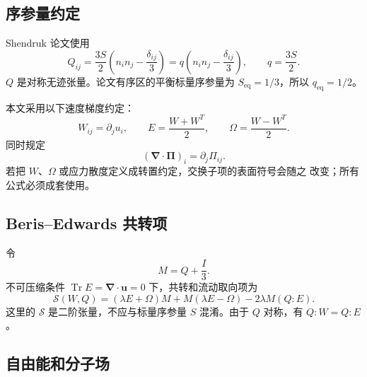 \documentclass[UTF8,11pt,a4paper]{ctexart}
\newcommand{\Tr}{\operatorname{Tr}}
\begin{document}
\subsection{序参量约定}

Shendruk 论文使用
\begin{equation}
  Q_{ij}=\frac{3S}{2}\left(n_i n_j-\frac{\delta_{ij}}{3}\right)
  =q\left(n_i n_j-\frac{\delta_{ij}}{3}\right),
  \qquad q=\frac{3S}{2}.
\end{equation}
$Q$ 是对称无迹张量。论文有序区的平衡标量序参量为
$S_{\mathrm{eq}}=1/3$，所以 $q_{\mathrm{eq}}=1/2$。

本文采用以下速度梯度约定：
\begin{equation}
  W_{ij}=\partial_j u_i,
  \qquad
  E=\frac{W+W^T}{2},
  \qquad
  \Omega=\frac{W-W^T}{2}.
\end{equation}
同时规定
\begin{equation}
  (\bm\nabla\!\cdot\bm\Pi)_i=\partial_j\Pi_{ij}.
  \label{eq:stress-divergence-convention}
\end{equation}
若把 $W$、$\Omega$ 或应力散度定义成转置约定，交换子项的表面符号会随之
改变；所有公式必须成套使用。

\subsection{Beris--Edwards 共转项}

令
\begin{equation}
  M=Q+\frac{I}{3}.
\end{equation}
不可压缩条件 $\Tr E=\bm\nabla\!\cdot\bm u=0$ 下，共转和流动取向项为
\begin{equation}
\boxed{
  \mathcal S(W,Q)
  =(\lambda E+\Omega)M
  +M(\lambda E-\Omega)
  -2\lambda M(Q:E).
}
\label{eq:alignment}
\end{equation}
这里的 $\mathcal S$ 是二阶张量，不应与标量序参量 $S$ 混淆。由于 $Q$
对称，有 $Q:W=Q:E$。

\subsection{自由能和分子场}
\end{document}
